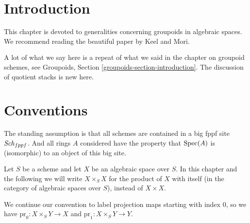 \section{Introduction}
\label{spaces-groupoids-section-introduction}
This chapter is devoted to generalities concerning groupoids in algebraic
spaces. We recommend reading the beautiful paper \cite{K-M} by Keel and Mori.

\medskip\noindent
A lot of what we say here is a repeat of what we said in the chapter
on groupoid schemes, see
Groupoids, Section \ref{groupoids-section-introduction}.
The discussion of quotient stacks is new here.

\section{Conventions}
\label{spaces-groupoids-section-conventions}
The standing assumption is that all schemes are contained in
a big fppf site $\mathit{Sch}_{fppf}$. And all rings $A$ considered
have the property that $\operatorname{Spec}(A)$ is (isomorphic) to an
object of this big site.

\medskip\noindent
Let $S$ be a scheme and let $X$ be an algebraic space over $S$.
In this chapter and the following we will write $X \times_S X$
for the product of $X$ with itself (in the category of algebraic
spaces over $S$), instead of $X \times X$.

\medskip\noindent
We continue our convention to label projection maps starting with
index $0$, so we have $\text{pr}_0 : X \times_S Y \to X$ and
$\text{pr}_1 : X \times_S Y \to Y$.

